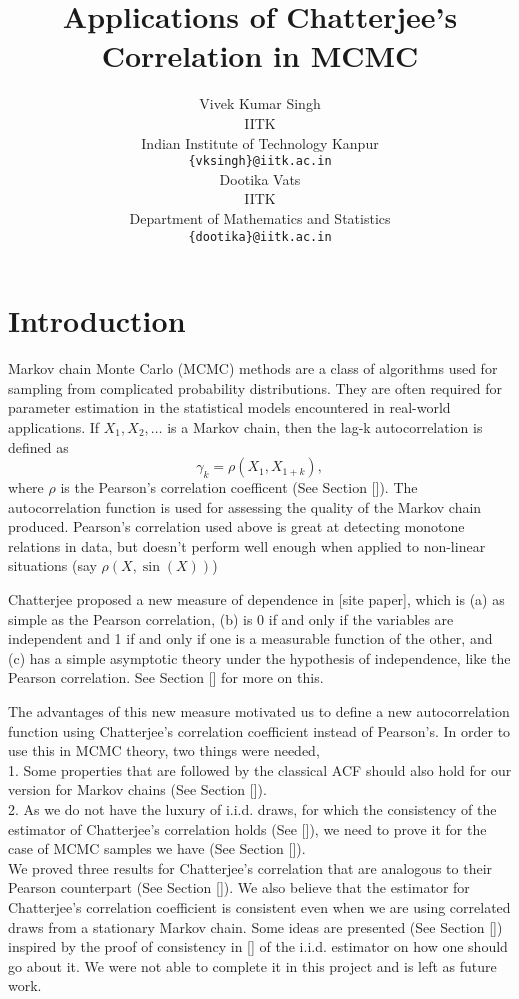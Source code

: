 \documentclass{article}
\title{Applications of Chatterjee's Correlation in MCMC
}
\author{
  Vivek Kumar Singh \\
  IITK \\
  Indian Institute of Technology Kanpur \\
  \texttt{\{vksingh\}@iitk.ac.in} \\
   \And
  Dootika Vats \\
 IITK \\
 Department of Mathematics and Statistics \\
 \texttt{\{dootika\}@iitk.ac.in}
}
\begin{document}
\maketitle

\section{Introduction}

	Markov chain Monte Carlo (MCMC) methods are a class of algorithms used for sampling from complicated probability distributions.
	They are often required for parameter estimation in the statistical models encountered in real-world applications.
	If $X_1, X_2, \dots$ is a Markov chain,
	then the lag-k autocorrelation is defined as
	$$\gamma_k = \rho(X_1, X_{1+k}),$$
	where $\rho$ is the Pearson's correlation coefficent (See Section []).
	The autocorrelation function is used for assessing the quality of the Markov chain produced.
	Pearson's correlation used above is great at detecting monotone relations in data,
	but doesn't perform well enough when applied to non-linear situations (say $\rho(X, \sin(X))$)

	Chatterjee proposed a new measure of dependence in [site paper], which is
	(a) as simple as the Pearson correlation,
	(b) is 0 if and only if the variables are independent and 1 if and only if one is a measurable function of the other, and
	(c) has a simple asymptotic theory under the hypothesis of independence, like the Pearson correlation.
	See Section [] for more on this.

	The advantages of this new measure motivated us to define a new autocorrelation function using Chatterjee's correlation coefficient instead of Pearson's.
	In order to use this in MCMC theory, two things were needed,\\
	1. Some properties that are followed by the classical ACF should also hold for our version for Markov chains (See Section []).\\
	2. As we do not have the luxury of i.i.d. draws, for which the consistency of the estimator of Chatterjee's correlation holds (See []),
		we need to prove it for the case of MCMC samples we have (See Section []).\\
	We proved three results for Chatterjee's correlation that are analogous to their Pearson counterpart (See Section []).
	We also believe that the estimator for Chatterjee's correlation coefficient is consistent even when we are using correlated draws from a stationary Markov chain.
	Some ideas are presented (See Section []) inspired by the proof of consistency in [] of the i.i.d. estimator on how one should go about it.
	We were not able to complete it in this project and is left as future work.
\end{document}

